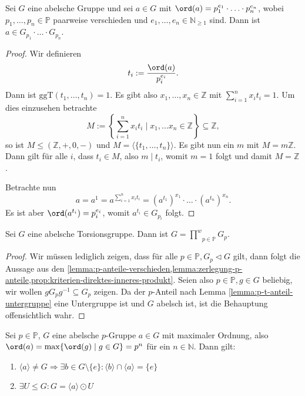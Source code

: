 \begin{lemma} \label{lemma:zerlegung-p-anteile}
    Sei $G$ eine abelsche Gruppe und sei $a \in G$ mit $\ord(a) = p_1^{e_1} \cdot \hdots \cdot p_n^{e_n}$, wobei $p_1, \hdots, p_n \in \mathbb{P}$ paarweise verschieden und $e_1,\ldots,e_n\in\mathbb{N}_{\geq 1}$ sind. Dann ist $a \in G_{p_1} \cdot \hdots \cdot G_{p_n}$.
\end{lemma}

\begin{proof}
    Wir definieren
    $$ t_i := \frac{\ord(a)}{p_i^{e_i}}. $$
    Dann ist $\mathrm{ggT}(t_1, \hdots, t_n) = 1$. Es gibt also $x_1, \hdots, x_n \in \mathbb{Z}$ mit $\sum_{i=1}^n x_i t_i = 1$. Um dies einzusehen betrachte
    $$ M := \left\{ \sum_{i=1}^n x_i t_i \mid x_1, \hdots x_n \in \mathbb{Z} \right\} \subseteq \mathbb{Z}, $$
    so ist $M \leq (\mathbb{Z}, +, 0, -)$ und $M = \langle \{ t_1, \hdots, t_n \} \rangle$. Es gibt nun ein $m$ mit $M = m \mathbb{Z}$. Dann gilt für alle $i$, dass $t_i \in M$, also $m \mid t_i$, womit $m = 1$ folgt und damit $M = \mathbb{Z}$.

    Betrachte nun
    $$ a = a^1 = a^{\sum_{i=1}^n x_i t_i} = (a^{t_1})^{x_1} \cdot \hdots \cdot (a^{t_n})^{x_n}. $$
    Es ist aber $\ord(a^{t_i}) = p_i^{e_i}$, womit $a^{t_i} \in G_{p_i}$ folgt.
\end{proof}


\begin{theorem}\label{theorem:p-produkt}
    Sei $G$ eine abelsche Torsionsgruppe. Dann ist $G = \stackrel{w}{\prod}_{p \in \mathbb{P}} G_p$.
\end{theorem}

\begin{proof}
    Wir müssen lediglich zeigen, dass für alle $p \in \mathbb{P}, G_p \vartriangleleft G$ gilt,
    dann folgt die Aussage aus den \cref{lemma:p-anteile-verschieden,lemma:zerlegung-p-anteile,prop:kriterien-direktes-inneres-produkt}. Seien also $p \in \mathbb{P}, g \in G$ beliebig, wir wollen $g G_p g^{-1} \subseteq G_p$ zeigen.
    Da der $p$-Anteil nach Lemma \ref{lemma:p-t-anteil-untergruppe} eine Untergruppe ist und $G$ abelsch ist, ist die Behauptung offensichtlich wahr.
\end{proof}

\begin{lemma}\label{lemma:p-gruppe-max-ordnung}
    Sei $p\in\mathbb{P}$, $G$ eine abelsche $p$-Gruppe $a \in G$ mit maximaler Ordnung, also $\ord(a)=\max\{\ord(g)\mid g\in G\}=p^n$ für ein $n\in\mathbb{N}$. Dann gilt:
    \begin{enumerate}
        \item $\langle a \rangle \neq G \Rightarrow \exists b \in G \setminus \{ e \} : \langle b \rangle \cap \langle a \rangle = \{ e \}$\label{item:lemma:p-gruppe-max-ordnung:1}
        \item $\exists U \leq G: G = \langle a \rangle \odot U$
    \end{enumerate}
\end{lemma}

